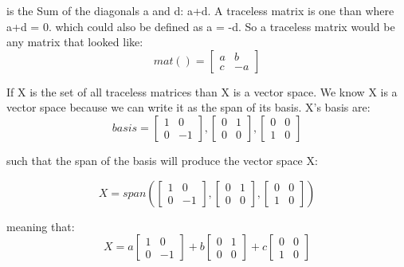 \documentclass[12pt]{article}
\begin{document}
is the Sum of the diagonals a and d: a+d. A traceless matrix is one than where a+d = 0. which could also be defined as a = -d. So a traceless matrix would be any matrix that looked like:
\[
mat() = 
\begin{bmatrix}
a & b\\
c & -a
\end{bmatrix}
\]

If X is the set of all traceless matrices than X is a vector space. We know X is a vector space because we can write it as the span of its basis. X's basis are:
\[
basis = 
\begin{bmatrix}
1& 0\\
0 & -1
\end{bmatrix}
,
\begin{bmatrix}
0 & 1\\
0 & 0
\end{bmatrix}
,
\begin{bmatrix}
0 & 0\\
1 & 0
\end{bmatrix}
\]

such that the span of the basis will produce the vector space X:

\[
X = 
span(
\begin{bmatrix}
1& 0\\
0 & -1
\end{bmatrix}
,
\begin{bmatrix}
0 & 1\\
0 & 0
\end{bmatrix}
,
\begin{bmatrix}
0 & 0\\
1 & 0
\end{bmatrix}
)
\]

meaning that:
\[
X = 
a
\begin{bmatrix}
1& 0\\
0 & -1
\end{bmatrix}
+ b
\begin{bmatrix}
0 & 1\\
0 & 0
\end{bmatrix}
+ c
\begin{bmatrix}
0 & 0\\
1 & 0
\end{bmatrix}
\]
\end{document}
